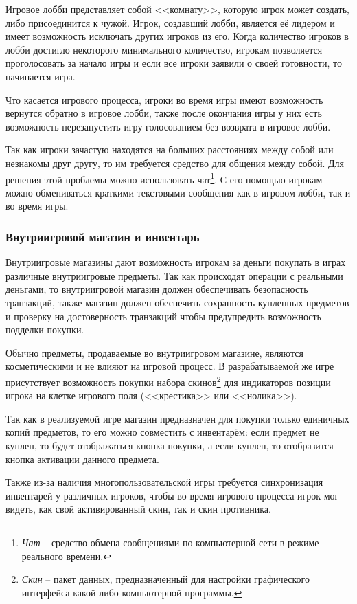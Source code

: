 Игровое лобби представляет собой <<комнату>>, которую игрок может создать, либо присоединится к чужой. Игрок, создавший лобби, является её лидером и имеет возможность исключать других игроков из его. Когда количество игроков в лобби достигло некоторого минимального количество, игрокам позволяется проголосовать за начало игры и если все игроки заявили о своей готовности, то начинается игра.

Что касается игрового процесса, игроки во время игры имеют возможность вернутся обратно в игровое лобби, также после окончания игры у них есть возможность перезапустить игру голосованием без возврата в игровое лобби.

Так как игроки зачастую находятся на больших расстояниях между собой или незнакомы друг другу, то им требуется средство для общения между собой. Для решения этой проблемы можно использовать чат\footnote{\emph{Чат} -- средство обмена сообщениями по компьютерной сети в режиме реального времени.}. С его помощью игрокам можно обмениваться краткими текстовыми сообщения как в игровом лобби, так и во время игры.


\subsubsection{Внутриигровой магазин и инвентарь}

Внутриигровые магазины дают возможность игрокам за деньги покупать в играх различные внутриигровые предметы. Так как происходят операции с реальными деньгами, то внутриигровой магазин должен обеспечивать безопасность транзакций, также магазин должен обеспечить сохранность купленных предметов и проверку на достоверность транзакций чтобы предупредить возможность подделки покупки.

Обычно предметы, продаваемые во внутриигровом магазине, являются косметическими и не влияют на игровой процесс. В разрабатываемой же игре присутствует возможность покупки набора скинов\footnote{\emph{Скин} -- пакет данных, предназначенный для настройки графического интерфейса какой-либо компьютерной программы.} для индикаторов позиции игрока на клетке игрового поля (<<крестика>> или <<нолика>>).

Так как в реализуемой игре магазин предназначен для покупки только единичных копий предметов, то его можно совместить с инвентарём: если предмет не куплен, то будет отображаться кнопка покупки, а если куплен, то отобразится кнопка активации данного предмета.

Также из-за наличия многопользовательской игры требуется синхронизация инвентарей у различных игроков, чтобы во время игрового процесса игрок мог видеть, как свой активированный скин, так и скин противника.


